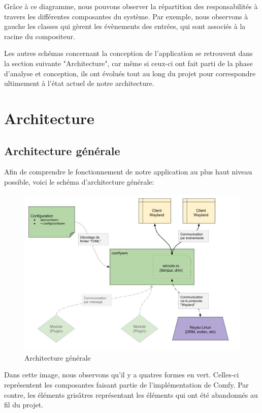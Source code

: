 \documentclass[titlepage]{article}
\begin{document}
\par
Grâce à ce diagramme, nous pouvons observer la répartition des responsabilités à travers les différentes composantes du système. Par exemple, nous observons à gauche les classes qui gèrent les évènements des entrées, qui sont associés à la racine du compositeur.
\bigskip

\par
Les autres schémas concernant la conception de l'application se retrouvent dans la section suivante "Architecture", car même si ceux-ci ont fait parti de la phase d'analyse et conception, ils ont évolués tout au long du projet pour correspondre ultimement à l'état actuel de notre architecture.
\bigskip

\section{Architecture}
\subsection{Architecture générale}
\par
Afin de comprendre le fonctionnement de notre application au plus haut niveau possible, voici le schéma d'architecture générale:
\bigskip

\begin{figure}[H]
	\centering
	\includegraphics[width=\textwidth]{architecture_generale_v1.jpg}
	\caption{Architecture générale}
\end{figure}

\par
Dans cette image, nous observons qu'il y a quatres formes en vert. Celles-ci représentent les composantes faisant partie de l'implémentation de Comfy. Par contre, les éléments grisâtres représentant les éléments qui ont été abandonnés au fil du projet.
\bigskip
\end{document}
